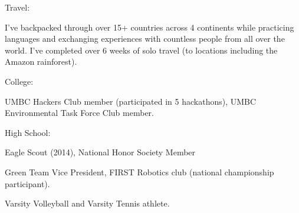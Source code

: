 
\begin{cventries}
  \cventry
    {Travel:} %
    {} %
    {} %
    {} %
    {
      \begin{cvitems} %
      \item {I've backpacked through over 15+ countries across 4 continents while practicing languages and exchanging experiences with countless people from all over the world.  I've completed over 6 weeks of solo travel (to locations including the Amazon rainforest).}
      \end{cvitems}
    }

  \cventry
    {College:} %
    {} %
    {} %
    {} %
    {
      \begin{cvitems} %
        \item {UMBC Hackers Club member (participated in 5 hackathons), UMBC Environmental Task Force Club member.}
      \end{cvitems}
    }

  \cventry
    {High School:} %
    {} %
    {} %
    {} %
    {
      \begin{cvitems} %
        \item {Eagle Scout (2014), National Honor Society Member}
        \item {Green Team Vice President, FIRST Robotics club (national championship participant).}
        \item {Varsity Volleyball and Varsity Tennis athlete.}
      \end{cvitems}
    }


\end{cventries}

\iffalse
\begin{cvskills}

  \cvskill
    {College}
    {UMBC Hackers Club member (participated in 5 hackathons), UMBC Environmental Task Force Club Member}

  \hline
  \cvskill
    {High School}
    {Eagle Scout (2014), National Honor Society Member, FIRST Robotics club (national championship participant), Varsity Volleyball, Varsity Tennis.}
\end{cvskills}
\fi
